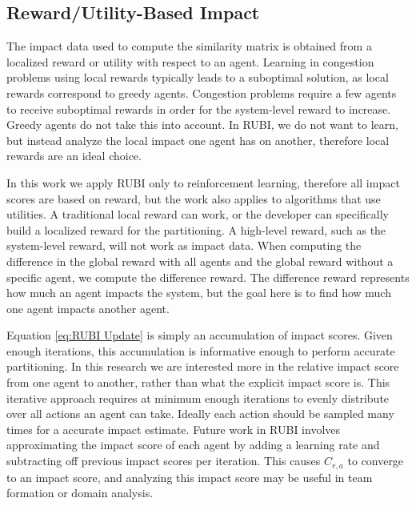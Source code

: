 \documentclass[letterpaper]{article}
\begin{document}
\subsection{Reward/Utility-Based Impact}
The impact data used to compute the similarity matrix is obtained from a localized reward or utility with respect to an agent. Learning in congestion problems using local rewards typically leads to a suboptimal solution, as local rewards correspond to greedy agents. Congestion problems require a few agents to receive suboptimal rewards in order for the system-level reward to increase. Greedy agents do not take this into account. In RUBI, we do not want to learn, but instead analyze the local impact one agent has on another, therefore local rewards are an ideal choice.

In this work we apply RUBI only to reinforcement learning, therefore all impact scores are based on reward, but the work also applies to algorithms that use utilities. A traditional local reward can work, or the developer can specifically build a localized reward for the partitioning. A high-level reward, such as the system-level reward, will not work as impact data. When computing the difference in the global reward with all agents and the global reward without a specific agent, we compute the difference reward. The difference reward represents how much an agent impacts the system, but the goal here is to find how much one agent impacts another agent.

Equation \ref{eq:RUBI Update} is simply an accumulation of impact scores. Given enough iterations, this accumulation is informative enough to perform accurate partitioning. In this research we are interested more in the relative impact score from one agent to another, rather than what the explicit impact score is. This iterative approach requires at minimum enough iterations to evenly distribute over all actions an agent can take. Ideally each action should be sampled many times for a accurate impact estimate. Future work in RUBI involves approximating the impact score of each agent by adding a learning rate and subtracting off previous impact scores per iteration. This causes $C_{r,a}$ to converge to an impact score, and analyzing this impact score may be useful in team formation or domain analysis.


\end{document}
